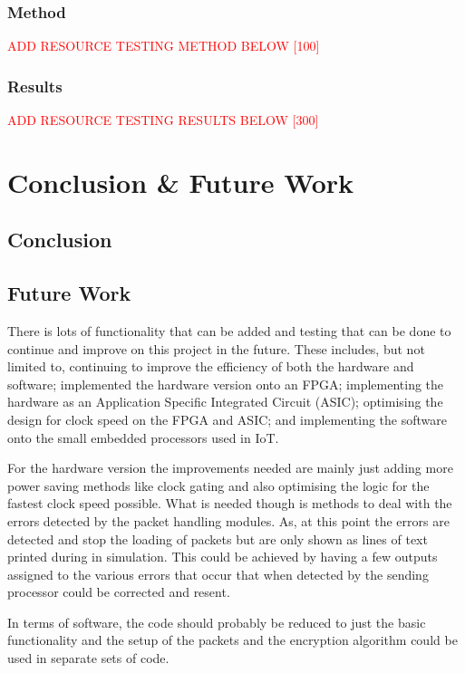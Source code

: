 \documentclass[12pt,twoside,a4paper]{report}
\begin{document}
	\subsection{Method}
	\textcolor{red}{ADD RESOURCE TESTING METHOD BELOW [100]}
	
	\subsection{Results}
	\textcolor{red}{ADD RESOURCE TESTING RESULTS BELOW [300]}

	\chapter{Conclusion \& Future Work}
	\label{chapter:CONC}
	
	\section{Conclusion}
	
	\section{Future Work}
	There is lots of functionality that can be added and testing that can be done to continue and improve on this project in the future. These includes, but not limited to, continuing to improve the efficiency of both the hardware and software; implemented the hardware version onto an FPGA; implementing the hardware as an Application Specific Integrated Circuit (ASIC); optimising the design for clock speed on the FPGA and ASIC; and implementing the software onto the small embedded processors used in IoT.
	
	For the hardware version the improvements needed are mainly just adding more power saving methods like clock gating and also optimising the logic for the fastest clock speed possible. What is needed though is methods to deal with the errors detected by the packet handling modules. As, at this point the errors are detected and stop the loading of packets but are only shown as lines of text printed during in simulation. This could be achieved by having a few outputs assigned to the various errors that occur that when detected by the sending processor could be corrected and resent.
	
	In terms of software, the code should probably be reduced to just the basic functionality and the setup of the packets and the encryption algorithm could be used in separate sets of code. 
	
\end{document}
